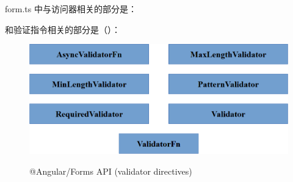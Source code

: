 
form.ts 中与访问器相关的部分是：




和验证指令相关的部分是（）：

\begin{figure}[!hbt]
  \centering
  \caption{@Angular/Forms API (validator directives)}
  \includegraphics[width=0.75\linewidth]{15_the_forms_package/forms_api_validator}
  \label{fig:forms_api_validator}
\end{figure}


